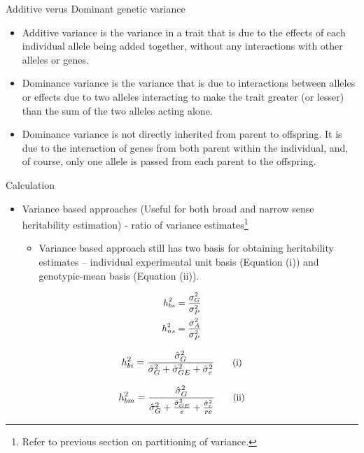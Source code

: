 \documentclass[11pt,ignorenonframetext,aspectratio=169]{beamer}
\providecommand{\tightlist}{%
  \setlength{\itemsep}{0pt}\setlength{\parskip}{0pt}}
\begin{document}
\begin{frame}{Additive verus Dominant genetic variance}
\protect\hypertarget{additive-verus-dominant-genetic-variance}{}
\begin{itemize}
\tightlist
\item
  Additive variance is the variance in a trait that is due to the
  effects of each individual allele being added together, without any
  interactions with other alleles or genes.
\item
  Dominance variance is the variance that is due to interactions between
  alleles or effects due to two alleles interacting to make the trait
  greater (or lesser) than the sum of the two alleles acting alone.
\item
  Dominance variance is not directly inherited from parent to offspring.
  It is due to the interaction of genes from both parent within the
  individual, and, of course, only one allele is passed from each parent
  to the offspring.
\end{itemize}
\end{frame}

\begin{frame}{Calculation}
\protect\hypertarget{calculation}{}
\small

\begin{itemize}
\tightlist
\item
  Variance based approaches (Useful for both broad and narrow sense
  heritability estimation) - ratio of variance
  estimates\footnote[frame]{Refer to previous section on partitioning of variance.}

  \begin{itemize}
  \tightlist
  \item
    Variance based approach still has two basis for obtaining
    heritability estimates -- individual experimental unit basis
    (Equation (i)) and genotypic-mean basis (Equation (ii)).
  \end{itemize}
\end{itemize}

\[
\small
\begin{aligned}
h_{bs}^2 &= \frac{\sigma^2_{G}}{\sigma^2_{P}} \\
h_{ns}^2 &= \frac{\sigma^2_{A}}{\sigma^2_{P}}
\end{aligned}
\]

\[
\small
h^2_{bi} = \frac{\hat{\sigma}^2_G}{\hat{\sigma}^2_G + \hat{\sigma}^2_{GE} + \hat{\sigma}^2_e}
\tag{i}
\]

\[
\small
h^2_{bm} = \frac{\hat{\sigma}^2_G}{\hat{\sigma}^2_G + \frac{\hat{\sigma}^2_{GE}}{e} + \frac{\hat{\sigma}^2_e}{re}}
\tag{ii}
\]
\end{frame}
\end{document}
